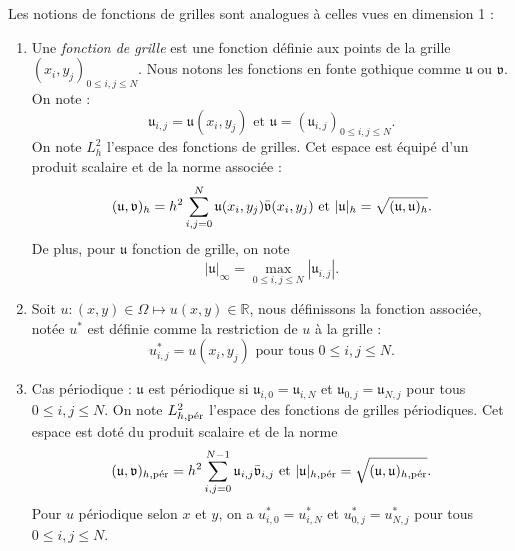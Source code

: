 Les notions de fonctions de grilles sont analogues à celles vues en dimension 1 :
\begin{enumerate}
\item Une \textit{fonction de grille} est une fonction définie aux points de la grille $(x_i,y_j)_{0 \leq i,j \leq N}$. Nous notons les fonctions en fonte gothique comme $\mathfrak{u}$ ou $\mathfrak{v}$. On note :
\begin{equation}
\mathfrak{u}_{i,j} = \mathfrak{u}(x_i,y_j) \text{ et }  \mathfrak{u} = \left( \mathfrak{u}_{i,j} \right)_{0 \leq i,j \leq N}.
\end{equation}
On note $L^2_h$ l'espace des fonctions de grilles. Cet espace est équipé d'un produit scalaire et de la norme associée :
\begin{equation}
(\mathfrak{u}, \mathfrak{v})_h = h^2 \gsum_{i,j=0}^N \mathfrak{u}(x_i, y_j) \bar{\mathfrak{v}}(x_i, y_j) \text{ et } |\mathfrak{u}|_h = \sqrt{(\mathfrak{u},\mathfrak{u})_h}.
\end{equation}
De plus, pour $\mathfrak{u}$ fonction de grille, on note
\begin{equation}
| \mathfrak{u} |_{\infty} = \max_{0 \leq i,j \leq N} |\mathfrak{u}_{i,j}|.
\end{equation}


\item Soit $u : (x,y) \in \Omega \mapsto u(x,y) \in \mathbb{R}$, nous définissons la fonction associée, notée $u^*$ est définie comme la restriction de $u$ à la grille :
\begin{equation}
u^*_{i,j} = u(x_i, y_j) \text{ pour tous } 0 \leq i,j \leq N.
\end{equation}

\item Cas périodique : $\mathfrak{u}$ est périodique si $\mathfrak{u}_{i,0} = \mathfrak{u}_{i,N}$ et $\mathfrak{u}_{0,j} = \mathfrak{u}_{N,j}$ pour tous $0 \leq i,j \leq N$. On note $L_{h,\per}^2$ l'espace des fonctions de grilles périodiques. Cet espace est doté du produit scalaire et de la norme
\begin{equation}
(\mathfrak{u},\mathfrak{v})_{h,\per} = h^2 \sum_{i,j=0}^{N-1} \mathfrak{u}_{i,j} \bar{\mathfrak{v}}_{i,j} \text{ et } |\mathfrak{u}|_{h,\per} = \sqrt{(\mathfrak{u}, \mathfrak{u})_{h,\per}}.
\end{equation}
Pour $u$ périodique selon $x$ et $y$, on a $u^*_{i,0}=u^*_{i,N}$ et $u^*_{0,j}=u^*_{N,j}$ pour tous $0 \leq i,j \leq N$.


\end{enumerate}
